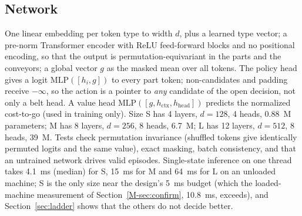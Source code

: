 \documentclass[11pt,a4paper]{article}
\theoremstyle{plain}
\theoremstyle{definition}
\theoremstyle{remark}
\begin{document}
\subsection{Network}
One linear embedding per token type to width $d$, plus a learned type vector; a pre-norm
Transformer encoder with ReLU feed-forward blocks and no positional encoding, so that the
output is permutation-equivariant in the parts and the conveyors; a global vector $g$ as
the masked mean over all tokens. The policy head gives a logit $\mathrm{MLP}([h_i,g])$ to
every part token; non-candidates and padding receive $-\infty$, so the action is a
pointer to \emph{any} candidate of the open decision, not only a belt head. A value head
$\mathrm{MLP}([g,h_{\mathrm{ctx}},h_{\mathrm{head}}])$ predicts the normalized cost-to-go
(used in training only). Size S has 4 layers, $d=128$, 4 heads, 0.88~M parameters; M
has 8 layers, $d=256$, 8 heads, 6.7~M; L has 12 layers, $d=512$, 8 heads, 39~M. Tests
check permutation invariance (shuffled tokens give identically permuted logits and the
same value), exact masking, batch consistency, and that an untrained network drives valid
episodes. Single-state inference on one thread takes 4.1~ms (median) for S, 15~ms for M
and 64~ms for L on an unloaded machine; S is the only size near the design's 5~ms
budget (which the loaded-machine measurement of Section~\ref{M-sec:confirm}, 10.8~ms,
exceeds), and Section~\ref{sec:ladder} shows that the others do not decide better.
\end{document}
